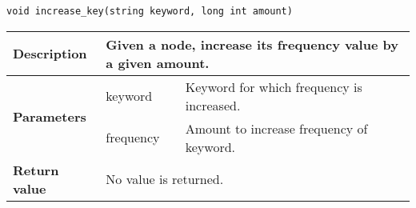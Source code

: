 \documentclass[12pt, reqno]{amsart}
\begin{document}
{\large \texttt{void increase\_key(string keyword, long int amount)}}
\begin{center}
    \begin{tabular}{| l | p{2.5cm} | p{9.5cm} |}
    \hline
    {\bfseries Description} & \multicolumn{2}{p{12.5cm}|}{Given a node, increase its frequency value by a given amount.} \\ \hline
    \multirow{2}{*}{\bfseries Parameters} & keyword & Keyword for which frequency is increased. \\ \cline{2-3}
    & frequency & Amount to increase frequency of keyword. \\ \hline
    {\bfseries Return value} & \multicolumn{2}{p{12.5cm}|}{No value is returned.} \\ \hline
    \end{tabular}
\end{center}
\end{document}
